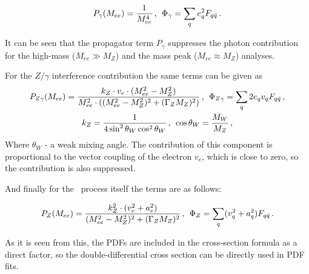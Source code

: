 \begin{equation}
P_{\gamma}(M_{ee}) = \frac{1}{M^{4}_{ee}}\,,\,\;\Phi_{\gamma} = \sum_{q} e^{2}_{q} F_{q\bar{q}} \,.
\end{equation}

It can be seen that the propagator term $P_{\gamma}$ suppresses the photon contribution for the high-mass ($M_{ee} \gg M_{Z}$) and the mass peak ($M_{ee} \approx M_{Z}$) analyses.

For the $Z/\gamma$ interference contribution the same terms can be given as
\begin{equation}
\begin{gathered}
P_{Z\gamma}(M_{ee}) = \frac{k_{Z} \cdot v_{e} \cdot (M_{ee}^{2} - M_{Z}^{2})}{M_{ee}^{2} \cdot ((M_{ee}^{2} - M_{Z}^{2})^{2} + (\Gamma_{Z}M_{Z})^{2})}\,,\,\;
\Phi_{Z\gamma} = \sum_{q} 2e_{q}v_{q} F_{q\bar{q}} \,,\\
k_{Z} = \frac{1}{4\sin^{2}\theta_W\cos^{2}\theta_W} \,, \,\; \cos\theta_W = \frac{M_{W}}{M_{Z}} \,,
\end{gathered}
\end{equation}
Where $\theta_{W}$ - a weak mixing angle. The contribution of this component is proportional to the vector coupling of the electron $v_{e}$, which is close to zero, so the contribution is also suppressed.

And finally for the \Zee\ process itself the terms are as follows:

\begin{equation}
P_{Z}(M_{ee}) = \frac{k^{2}_{Z} \cdot (v^{2}_{e} + a^{2}_{e})}{(M^{2}_{ee} - M^{2}_{Z})^{2} + (\Gamma_{Z}M_{Z})^{2}}\,,\,\;
\Phi_{Z} = \sum_{q} (v^{2}_{q} + a^{2}_{q}) F_{q\bar{q}} \,.
\end{equation}

As it is seen from this, the PDFs are included in the cross-section formula as a direct factor, so the double-differential cross section can be directly used in PDF fits.

\begin{figure}
\end{figure}


